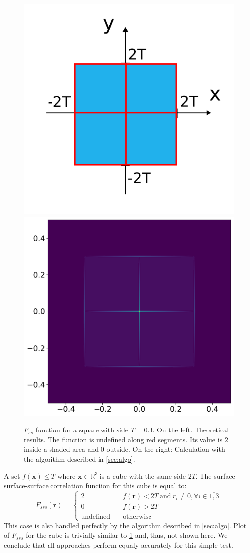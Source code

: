 \documentclass[reprint,amsmath,amssymb,aps,pre,showkeys,showpacs]{revtex4-1}
\begin{document}
\begin{figure}
  \centering
  \includegraphics[width=0.45\linewidth]{images/fss-square.png}
  \hfill
  \includegraphics[width=0.45\linewidth]{images/fss-square-julia.png}
  \caption[]{$F_{ss}$ function for a square with side $T = 0.3$. On the left:
    Theoretical results. The function is undefined along red segments. Its value
    is $2$ inside a shaded area and $0$ outside. On the right: Calculation with
    the algorithm described in \cref{sec:algo}.}
  \label{fig:fss-square}
\end{figure}

A set $f(\bm{x}) \le T$ where $\bm{x} \in \mathbb{R}^3$ is a cube with the same
side $2T$.
The surface-surface-surface correlation function for this cube is equal to:
\begin{equation*}
  F_{sss}(\bm{r}) = \left\{
  \begin{array}{ll}
    2 & \quad f(\bm{r}) < 2T \ \text{and}\ r_i \ne 0, \forall i \in \overline{1,3} \\
    0 & \quad f(\bm{r}) > 2T \\
    \text{undefined} & \quad \text{otherwise}
  \end{array}
  \right.
\end{equation*}
This case is also handled perfectly by the algorithm described in
\cref{sec:algo}. Plot of $F_{sss}$ for the cube is trivially similar to
\cref{fig:fss-square} and, thus, not shown here. We conclude that all approaches
perform equaly accurately for this simple test.
\end{document}
